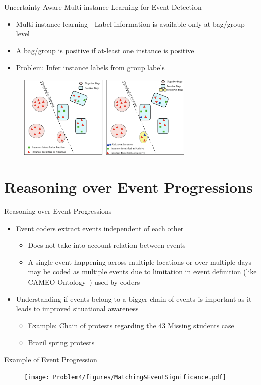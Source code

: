 \begin{frame}{Uncertainty Aware Multi-instance Learning for Event Detection}
\begin{itemize}
    \item Multi-instance learning - Label information is available only at bag/group level
    \item A bag/group is positive if at-least one instance is positive
    \item Problem: Infer instance labels from group labels
\end{itemize}
    \begin{figure}
        \centering
        \includegraphics[width=0.75\textwidth]{Problem4/figures/MIL_kwik.png}
    \end{figure}
\end{frame}

\section{Reasoning over Event Progressions}
\begin{frame}{Reasoning over Event Progressions}
\begin{itemize}
    \item Event coders extract events independent of each other
        \begin{itemize}
            \item Does not take into account relation between events 
            \item A single event happening across multiple locations or over multiple days may be coded
            as multiple events due to limitation in event definition  (like CAMEO Ontology~\cite{schrodt2012cameo}) used by coders
        \end{itemize}
    \item Understanding if events belong to a bigger chain of events is important as it leads to improved situational awareness
    \begin{itemize}
        \item Example: Chain of protests regarding the 43 Missing students case
        \item Brazil spring protests
    \end{itemize}
\end{itemize}
\end{frame}
\begin{frame}{Example of Event Progression}
    \begin{figure}
        \centering
        \texttt{[image: Problem4/figures/Matching\&EventSignificance.pdf]}
    \end{figure}
\end{frame}

